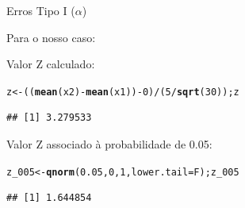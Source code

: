 \documentclass{beamer}\usepackage[]{graphicx}\usepackage[]{color}
\makeatletter
\newcommand{\hlnum}[1]{\textcolor[rgb]{0.686,0.059,0.569}{#1}}%
\newcommand{\hlopt}[1]{\textcolor[rgb]{0,0,0}{#1}}%
\newcommand{\hlstd}[1]{\textcolor[rgb]{0.345,0.345,0.345}{#1}}%
\newcommand{\hlkwb}[1]{\textcolor[rgb]{0.69,0.353,0.396}{#1}}%
\newcommand{\hlkwc}[1]{\textcolor[rgb]{0.333,0.667,0.333}{#1}}%
\newcommand{\hlkwd}[1]{\textcolor[rgb]{0.737,0.353,0.396}{\textbf{#1}}}%
\newenvironment{kframe}{%
 \def\at@end@of@kframe{}%
 \ifinner\ifhmode%
  \def\at@end@of@kframe{\end{minipage}}%
  \begin{minipage}{\columnwidth}%
 \fi\fi%
 \def\FrameCommand##1{\hskip\@totalleftmargin \hskip-\fboxsep
 \colorbox{shadecolor}{##1}\hskip-\fboxsep
     \hskip-\linewidth \hskip-\@totalleftmargin \hskip\columnwidth}%
 \MakeFramed {\advance\hsize-\width
   \@totalleftmargin\z@ \linewidth\hsize
   \@setminipage}}%
 {\par\unskip\endMakeFramed%
 \at@end@of@kframe}
\newenvironment{knitrout}{}{} %
\renewenvironment{knitrout}{\setlength{\topsep}{0mm}}{}
\makeatother
\begin{document}
\begin{frame}[fragile]{Erros Tipo I ($\alpha$)}

Para o nosso caso:

Valor Z calculado:

\begin{knitrout}\tiny
{}\color{fgcolor}\begin{kframe}
\begin{alltt}
\hlstd{z}\hlkwb{<-} \hlstd{((}\hlkwd{mean}\hlstd{(x2)}\hlopt{-}\hlkwd{mean}\hlstd{(x1))} \hlopt{-} \hlnum{0}\hlstd{)}\hlopt{/} \hlstd{(}\hlnum{5}\hlopt{/}\hlkwd{sqrt}\hlstd{(}\hlnum{30}\hlstd{)); z}
\end{alltt}
\begin{verbatim}
## [1] 3.279533
\end{verbatim}
\end{kframe}
\end{knitrout}

Valor Z associado à probabilidade de 0.05: 

\begin{knitrout}\tiny
{}\color{fgcolor}\begin{kframe}
\begin{alltt}
\hlstd{z_005} \hlkwb{<-} \hlkwd{qnorm}\hlstd{(}\hlnum{0.05}\hlstd{,}\hlnum{0}\hlstd{,}\hlnum{1}\hlstd{,}\hlkwc{lower.tail}\hlstd{=F); z_005}
\end{alltt}
\begin{verbatim}
## [1] 1.644854
\end{verbatim}
\end{kframe}
\end{knitrout}
\end{frame}
\end{document}
